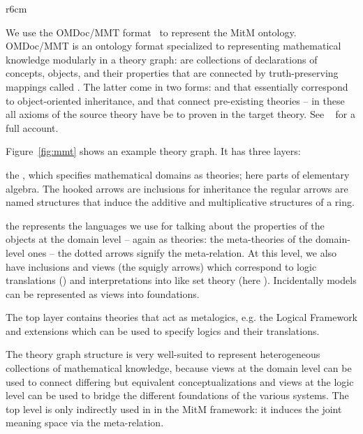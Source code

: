 \begin{wrapfigure}r{6cm}\centering\vspace*{-2em}
  \vspace*{-.5em}
  \caption{OMDoc/MMT Theory Graphs}\label{fig:mmt}\vspace*{-1em}
\end{wrapfigure}
We use the OMDoc/MMT format~\cite{Kohlhase:OMDoc1.2,MMTSVN:on} to represent the MitM
ontology. OMDoc/MMT is an ontology format specialized to representing mathematical
knowledge modularly in a theory graph:  are collections of declarations
of concepts, objects, and their properties that are connected by truth-preserving mappings
called . The latter come in two forms:  and
 that essentially correspond to object-oriented inheritance, and
 that connect pre-existing theories -- in these all axioms of the source
theory have be to proven in the target theory. See ~\cite{RabKoh:WSMSML13} for a full
account. 

Figure~\ref{fig:mmt} shows an example theory graph. It has three layers:
\begin{compactenum}[\em i\rm)]
\item the , which specifies mathematical domains as theories; here
  parts of elementary algebra. The hooked arrows are inclusions for inheritance the
  regular arrows are named structures that induce the additive and multiplicative
  structures of a ring.
\item the  represents the languages we use for talking about the
  properties of the objects at the domain level -- again as theories: the meta-theories of
  the domain-level ones -- the dotted arrows signify the meta-relation. At this level, we
  also have inclusions and views (the squigly arrows) which correspond to logic
  translations () and interpretations into  like
  set theory (here ). Incidentally models can be represented as views into
  foundations.
\item The top layer contains theories that act as metalogics, e.g. the Logical Framework
   and extensions which can be used to specify logics and their translations.
\end{compactenum}
The theory graph structure is very well-suited to represent heterogeneous collections of
mathematical knowledge, because views at the domain level can be used to connect differing
but equivalent conceptualizations and views at the logic level can be used to bridge the
different foundations of the various systems. The top level is only indirectly used in in
the MitM framework: it induces the joint meaning space via the meta-relation.

